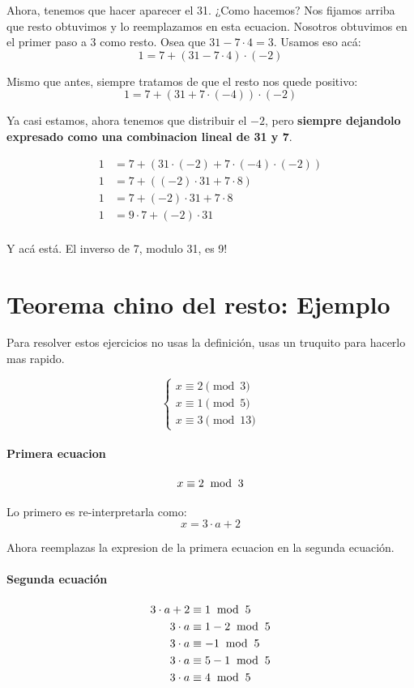 \documentclass[12pt,a4paper]{report}
\begin{document}
Ahora, tenemos que hacer aparecer el 31. ¿Como hacemos? Nos fijamos arriba que resto obtuvimos y lo reemplazamos en esta ecuacion. Nosotros obtuvimos en el primer paso a 3 como resto. Osea que $31 - 7 \cdot 4 = 3$. Usamos eso acá:
$$
1 = 7 + (31 - 7 \cdot 4) \cdot (-2)
$$

Mismo que antes, siempre tratamos de que el resto nos quede positivo:
$$
1 = 7 + (31 + 7 \cdot (-4)) \cdot (-2)
$$

Ya casi estamos, ahora tenemos que distribuir el $-2$, pero \textbf{siempre dejandolo expresado como una combinacion lineal de 31 y 7}.

$$
\begin{aligned}
1 &= 7 + (31 \cdot ( -2) + 7 \cdot (-4) \cdot (-2)) \\
1 &= 7 + ((-2) \cdot 31 + 7 \cdot 8) \\
1 &= 7 + (-2) \cdot 31 + 7 \cdot 8 \\
1 &= 9 \cdot 7 + (-2) \cdot 31 \\
\end{aligned}
$$

Y acá está. El inverso de 7, modulo 31,  es 9!

\section{Teorema chino del resto: Ejemplo}

Para resolver estos ejercicios no usas la definición, usas un truquito para hacerlo mas rapido.

$$
\begin{cases}
x \equiv 2 \pmod{3} \\
x \equiv 1 \pmod{5} \\
x \equiv 3 \pmod{13}
\end{cases}
$$

\paragraph{Primera ecuacion}
$$
x \equiv 2 \; \bmod \; {{3}}
$$

Lo primero es re-interpretarla como:
$$
x = 3 \cdot a + 2
$$


Ahora reemplazas la expresion de la primera ecuacion en la segunda ecuación.
\paragraph{Segunda ecuación}
$$
\begin{aligned}
3 \cdot a + 2 &\equiv 1 \; \bmod \; {{5}} \\
3 \cdot a &\equiv 1 -2 \; \bmod \; {{5}} \\
3 \cdot a &\equiv -1 \; \bmod \; {{5}} \\
3 \cdot a &\equiv 5 - 1 \; \bmod \; {{5}} \\
3 \cdot a &\equiv 4 \; \bmod \; {{5}} \\
\end{aligned}
$$
\end{document}
